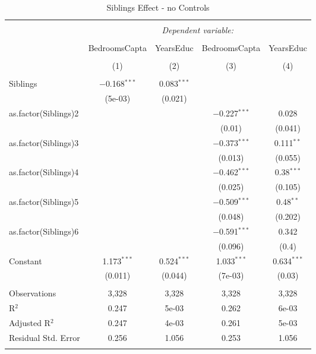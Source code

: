 
\begin{table}[!htbp] \centering 
  \caption{Siblings Effect - no Controls} 
  \label{} 
\begin{tabular}{@{\extracolsep{5pt}}lcccc} 
\\[-1.8ex]\hline 
\hline \\[-1.8ex] 
 & \multicolumn{4}{c}{\textit{Dependent variable:}} \\ 
\cline{2-5} 
\\[-1.8ex] & BedroomsCapta & YearsEduc & BedroomsCapta & YearsEduc \\ 
\\[-1.8ex] & (1) & (2) & (3) & (4)\\ 
\hline \\[-1.8ex] 
 Siblings & $-$0.168$^{***}$ & 0.083$^{***}$ &  &  \\ 
  & (5e-03) & (0.021) &  &  \\ 
  as.factor(Siblings)2 &  &  & $-$0.227$^{***}$ & 0.028 \\ 
  &  &  & (0.01) & (0.041) \\ 
  as.factor(Siblings)3 &  &  & $-$0.373$^{***}$ & 0.111$^{**}$ \\ 
  &  &  & (0.013) & (0.055) \\ 
  as.factor(Siblings)4 &  &  & $-$0.462$^{***}$ & 0.38$^{***}$ \\ 
  &  &  & (0.025) & (0.105) \\ 
  as.factor(Siblings)5 &  &  & $-$0.509$^{***}$ & 0.48$^{**}$ \\ 
  &  &  & (0.048) & (0.202) \\ 
  as.factor(Siblings)6 &  &  & $-$0.591$^{***}$ & 0.342 \\ 
  &  &  & (0.096) & (0.4) \\ 
  Constant & 1.173$^{***}$ & 0.524$^{***}$ & 1.033$^{***}$ & 0.634$^{***}$ \\ 
  & (0.011) & (0.044) & (7e-03) & (0.03) \\ 
 \hline \\[-1.8ex] 
Observations & 3,328 & 3,328 & 3,328 & 3,328 \\ 
R$^{2}$ & 0.247 & 5e-03 & 0.262 & 6e-03 \\ 
Adjusted R$^{2}$ & 0.247 & 4e-03 & 0.261 & 5e-03 \\ 
Residual Std. Error & 0.256 & 1.056 & 0.253 & 1.056 \\ 
\hline 
\hline \\[-1.8ex] 
\end{tabular} 
\end{table} 
